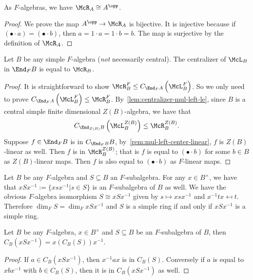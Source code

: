  \begin{lemma}\label{lem:mul-right-iso-opp}
   As $F$-algebras, we have $\McR_{A}\cong A^{\opp}$. \leanok
 \end{lemma}
 \begin{proof}
   We prove the map $A^{\opp} \to \McR_{A}$ is bijective. It is injective
   because if $\left(\bullet \cdot a\right) = \left(\bullet\cdot b\right)$, then
   $a = 1 \cdot a = 1 \cdot b = b$. The map is surjective by the definition of
   $\McR_{A}$.
 \end{proof}
 \begin{lemma}\label{lem:centralizer-mul-left-eq-mul-right}
   Let $B$ be any simple $F$-algebra ({\em not\/} necessarily central). The
   centralizer of $\McL_{B}$ in $\End_{F}B$ is equal to $\McR_{B}$.
   \leanok
 \end{lemma}
 \begin{proof}
   It is straightforward to show
   $\McR_{B}^{F}\le C_{\End_{F}A}\left(\McL_{B}^{F}\right)$. So we only need to
   prove $C_{\End_{F}A}\left(\McL_{B}^{F}\right)\le \McR_{B}^{F}$.
   By~\cref{lem:centralizer-mul-left-le}, since $B$ is a central simple finite
   dimensional $Z(B)$-algebra, we have that
   \[
     C_{\End_{Z(B)}B}\left(\McL_{B}^{Z(B)}\right) \le \McR_{B}^{Z(B)}.
   \]
   Suppose $f\in\End_{F}B$ is in $C_{\End_{F}B}B$, by~\cref{rem:mul-left-center-linear}, $f$ is $Z(B)$-linear as well. Then $f$ is
   in $\McR_{B}^{Z(B)}$; that is $f$ is equal to $\left(\bullet\cdot b\right)$
   for some $b \in B$ as $Z(B)$-linear maps. Then $f$ is also equal to
   $\left(\bullet\cdot b\right)$ as $F$-linear maps.
 \end{proof}

 \begin{construction}
   Let $B$ be any $F$-algebra and $S\subseteq B$ an $F$-subalgebra. For any
   $x\in B^{\times}$, we have that $x S x^{-1}:=\{xsx^{-1}|s\in S\}$ is an
   $F$-subalgebra of $B$ as well. We have the obvious $F$-algebra isomorphism
   $S \cong xSx^{-1}$ given by $s\mapsto xsx^{-1}$ and $x^{-1}tx\mapsfrom t$.
   Therefore $\dim_{F}S=\dim_{F}xSx^{-1}$ and $S$ is a simple ring if and only
   if $xSx^{-1}$ is a simple ring.
   \leanok
 \end{construction}

 \begin{lemma}
   \label{lem:centralizer-conj}
   Let $B$ be any $F$-algebra, $x \in B^{\times}$ and $S\subseteq B$ be an
   $F$-subalgebra of $B$, then $C_{B}(xSx^{-1})=x\left(C_{B}(S)\right)x^{-1}$.
   \leanok
 \end{lemma}
 \begin{proof}
   If $a \in C_{B}\left(xSx^{-1}\right)$, then $x^{-1}ax$ is in $C_{B}(S)$.
   Conversely if $a$ is equal to $xbx^{-1}$ with $b\in C_{B}(S)$, then it is in
   $C_{B}\left(xSx^{-1}\right)$ as well.
 \end{proof}

